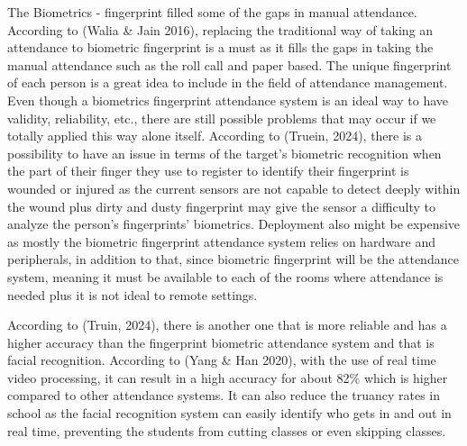 The Biometrics - fingerprint filled some of the gaps in manual attendance. According to (Walia \& Jain 2016), replacing the traditional way of taking an attendance to biometric fingerprint is a must as it fills the gaps in taking the manual attendance such as the roll call and paper based. The unique fingerprint of each person is a great idea to include in the field of attendance management. Even though a biometrics fingerprint attendance system is an ideal way to have validity, reliability, etc., there are still possible problems that may occur if we totally applied this way alone itself. According to (Truein, 2024), there is a possibility to have an issue in terms of the target’s biometric recognition when the part of their finger they use to register to identify their fingerprint is wounded or injured as the current sensors are not capable to detect deeply within the wound plus dirty and dusty fingerprint may give the sensor a difficulty to analyze the person’s fingerprints’ biometrics. Deployment also might be expensive as mostly the biometric fingerprint attendance system relies on hardware and peripherals, in addition to that, since biometric fingerprint will be the attendance system, meaning it must be available to each of the rooms where attendance is needed plus it is not ideal to remote settings.

According to (Truin, 2024), there is another one that is more reliable and has a higher accuracy than the fingerprint biometric attendance system and that is facial recognition. According to (Yang \& Han 2020), with the use of real time video processing, it can result in a high accuracy for about 82\% which is higher compared to other attendance systems. It can also reduce the truancy rates in school as the facial recognition system can easily identify who gets in and out in real time, preventing the students from cutting classes or even skipping classes.



